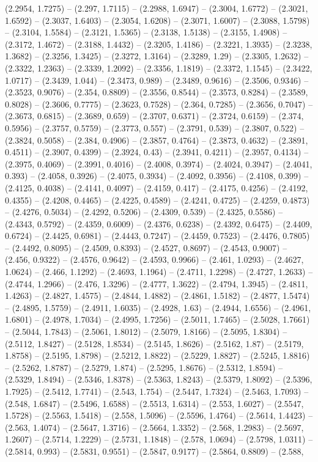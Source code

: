 (2.2954, 1.7275) -- (2.297, 1.7115) -- (2.2988, 1.6947) -- (2.3004, 1.6772) -- (2.3021, 1.6592) -- (2.3037, 1.6403) -- (2.3054, 1.6208) -- (2.3071, 1.6007) -- (2.3088, 1.5798) -- (2.3104, 1.5584) -- (2.3121, 1.5365) -- (2.3138, 1.5138) -- (2.3155, 1.4908) -- (2.3172, 1.4672) -- (2.3188, 1.4432) -- (2.3205, 1.4186) -- (2.3221, 1.3935) -- (2.3238, 1.3682) -- (2.3256, 1.3425) -- (2.3272, 1.3164) -- (2.3289, 1.29) -- (2.3305, 1.2632) -- (2.3322, 1.2363) -- (2.3339, 1.2092) -- (2.3356, 1.1819) -- (2.3372, 1.1545) -- (2.3422, 1.0717) -- (2.3439, 1.044) -- (2.3473, 0.989) -- (2.3489, 0.9616) -- (2.3506, 0.9346) -- (2.3523, 0.9076) -- (2.354, 0.8809) -- (2.3556, 0.8544) -- (2.3573, 0.8284) -- (2.3589, 0.8028) -- (2.3606, 0.7775) -- (2.3623, 0.7528) -- (2.364, 0.7285) -- (2.3656, 0.7047) -- (2.3673, 0.6815) -- (2.3689, 0.659) -- (2.3707, 0.6371) -- (2.3724, 0.6159) -- (2.374, 0.5956) -- (2.3757, 0.5759) -- (2.3773, 0.557) -- (2.3791, 0.539) -- (2.3807, 0.522) -- (2.3824, 0.5058) -- (2.384, 0.4906) -- (2.3857, 0.4764) -- (2.3873, 0.4632) -- (2.3891, 0.4511) -- (2.3907, 0.4399) -- (2.3924, 0.43) -- (2.3941, 0.4211) -- (2.3957, 0.4134) -- (2.3975, 0.4069) -- (2.3991, 0.4016) -- (2.4008, 0.3974) -- (2.4024, 0.3947) -- (2.4041, 0.393) -- (2.4058, 0.3926) -- (2.4075, 0.3934) -- (2.4092, 0.3956) -- (2.4108, 0.399) -- (2.4125, 0.4038) -- (2.4141, 0.4097) -- (2.4159, 0.417) -- (2.4175, 0.4256) -- (2.4192, 0.4355) -- (2.4208, 0.4465) -- (2.4225, 0.4589) -- (2.4241, 0.4725) -- (2.4259, 0.4873) -- (2.4276, 0.5034) -- (2.4292, 0.5206) -- (2.4309, 0.539) -- (2.4325, 0.5586) -- (2.4343, 0.5792) -- (2.4359, 0.6009) -- (2.4376, 0.6238) -- (2.4392, 0.6475) -- (2.4409, 0.6724) -- (2.4425, 0.6981) -- (2.4443, 0.7247) -- (2.4459, 0.7523) -- (2.4476, 0.7805) -- (2.4492, 0.8095) -- (2.4509, 0.8393) -- (2.4527, 0.8697) -- (2.4543, 0.9007) -- (2.456, 0.9322) -- (2.4576, 0.9642) -- (2.4593, 0.9966) -- (2.461, 1.0293) -- (2.4627, 1.0624) -- (2.466, 1.1292) -- (2.4693, 1.1964) -- (2.4711, 1.2298) -- (2.4727, 1.2633) -- (2.4744, 1.2966) -- (2.476, 1.3296) -- (2.4777, 1.3622) -- (2.4794, 1.3945) -- (2.4811, 1.4263) -- (2.4827, 1.4575) -- (2.4844, 1.4882) -- (2.4861, 1.5182) -- (2.4877, 1.5474) -- (2.4895, 1.5759) -- (2.4911, 1.6035) -- (2.4928, 1.63) -- (2.4944, 1.6556) -- (2.4961, 1.6801) -- (2.4978, 1.7034) -- (2.4995, 1.7256) -- (2.5011, 1.7465) -- (2.5028, 1.7661) -- (2.5044, 1.7843) -- (2.5061, 1.8012) -- (2.5079, 1.8166) -- (2.5095, 1.8304) -- (2.5112, 1.8427) -- (2.5128, 1.8534) -- (2.5145, 1.8626) -- (2.5162, 1.87) -- (2.5179, 1.8758) -- (2.5195, 1.8798) -- (2.5212, 1.8822) -- (2.5229, 1.8827) -- (2.5245, 1.8816) -- (2.5262, 1.8787) -- (2.5279, 1.874) -- (2.5295, 1.8676) -- (2.5312, 1.8594) -- (2.5329, 1.8494) -- (2.5346, 1.8378) -- (2.5363, 1.8243) -- (2.5379, 1.8092) -- (2.5396, 1.7925) -- (2.5412, 1.7741) -- (2.543, 1.754) -- (2.5447, 1.7324) -- (2.5463, 1.7093) -- (2.548, 1.6847) -- (2.5496, 1.6588) -- (2.5513, 1.6314) -- (2.553, 1.6027) -- (2.5547, 1.5728) -- (2.5563, 1.5418) -- (2.558, 1.5096) -- (2.5596, 1.4764) -- (2.5614, 1.4423) -- (2.563, 1.4074) -- (2.5647, 1.3716) -- (2.5664, 1.3352) -- (2.568, 1.2983) -- (2.5697, 1.2607) -- (2.5714, 1.2229) -- (2.5731, 1.1848) -- (2.578, 1.0694) -- (2.5798, 1.0311) -- (2.5814, 0.993) -- (2.5831, 0.9551) -- (2.5847, 0.9177) -- (2.5864, 0.8809) -- (2.588, 